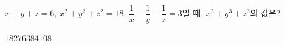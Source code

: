 $x+y+z=6$, $x^2+y^2+z^2=18$, $\dfrac{1}{x}+\dfrac{1}{y}+\dfrac{1}{z}=3$일 때, $x^3+y^3+z^3$의 값은?
\begin{choices32}{$18$}{$27$}{$63$}{$84$}{$108$}\end{choices32}
